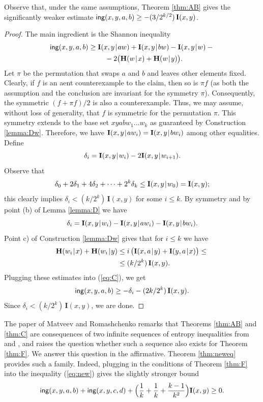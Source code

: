 \documentclass[10pt,a4paper]{amsart}
\def\|{\mskip1.5mu{|}\mskip1.5mu}
\def\H{\mathbf H}
\def\I{\mathbf I}
\def\ing[#1,#2,#3,#4]{\mathsf{ing}(#1,#2,#3,#4\mkern 0mu)}
\begin{document}
Observe that, under the same assumptions, Theorem \ref{thm:AB} gives the
significantly weaker estimate $\ing[x,y,a,b]\ge -(3/2^{k/2})\,\I(x,y)$.

\begin{proof}
The main ingredient is the Shannon inequality
\begin{align}\label{eq:C}
\ing[x,y,a,b] &\ge  \I(x,y\|aw)+\I(x,y\|bw)-\I(x,y\|w) - {} \\
     &~~~~~~~  - 2\big(\H(w\|x)+\H(w\|y)\big)\nonumber.
\end{align}
Let $\pi$ be the permutation that swaps $a$ and $b$ and leaves other
elements fixed. Clearly, if $f$ is an aent counterexample to the claim, then
so is $\pi f$ (as both the assumption and the conclusion are invariant for
the symmetry $\pi$). Consequently, the symmetric $(f+\pi f)/2$ is also a
counterexample. Thus, we may assume, without loss of generality, that $f$ is
symmetric for the permutation $\pi$. This symmetry extends to the base set
$xyabw_1\dots w_k$ as guaranteed by Construction \ref{lemma:Dw}.
Therefore, we have $\I(x,y\|aw_i)= \I(x,y\|bw_i)$ among other equalities. Define
$$
   \delta_i=\I(x,y\|w_i)- 2\I(x,y\|w_{i+1}).
$$
Observe that
$$
   \delta_0+2\delta_1+4\delta_2+\cdots+2^k\delta_k \le \I(x,y\|w_0)=\I(x,y);
$$
this clearly implies $\delta_i<(k/2^k)\,\I(x,y)$ for some $i\le k$.
By symmetry and by point (b) of Lemma \ref{lemma:D} we have
$$
   \delta_i = \I(x,y\|w_i)-\I(x,y\|aw_i)-\I(x,y\|bw_i).
$$
Point c) of Construction \ref{lemma:Dw} gives that for $i\le k$ we have
\begin{align*}
  \H(w_i\|x)+\H(w_i\|y) &\le i\,\big(\I(x,a\|y)+\I(y,a\|x)\big) \le {}\\
   &\le (k/2^k)\,\I(x,y).
\end{align*}
Plugging these estimates into (\ref{eq:C}), we get
$$
   \ing[x,y,a,b] \ge -\delta_i - (2k/2^k)\,\I(x,y).
$$
Since $\delta_i<(k/2^k)\,\I(x,y)$, we are done.
\end{proof}

The paper \cite{rom3} of Matveev and Romashchenko remarks that Theorems
\ref{thm:AB} and \ref{thm:C} are consequences of two infinite sequences of
entropy inequalities from \cite{M.infinf} and \cite{DFZ11}, and raises the
question whether such a sequence also exists for Theorem \ref{thm:F}. We
answer this question in the affirmative. Theorem \ref{thm:neweq} provides
such a family. Indeed, plugging in the conditions of Theorem \ref{thm:F}
into the inequality (\ref{eq:new}) gives the slightly stronger bound
$$
   \ing[x,y,a,b]+\ing[x,y,c,d]+\Big(\frac1k+\frac1k+\frac{k-1}{k^2}
   \Big)\I(x,y) \ge 0.
$$
\end{document}
